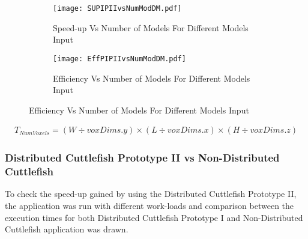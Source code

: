 \begin{figure}
\centering
\captionsetup[subfigure]{labelformat=empty}
\begin{subfigure}
\centering
\texttt{[image: SUPIPIIvsNumModDM.pdf]}
\caption{Speed-up Vs Number of Models For Different Models Input}
\label{fig:SUPIPIIvsNumModDM}
\end{subfigure}
\begin{subfigure}
\centering
\texttt{[image: EffPIPIIvsNumModDM.pdf]}
\caption{Efficiency Vs Number of Models For Different Models Input}
\label{fig:EffPIPIIvsNumModDM}
\end{subfigure}
\end{figure}


\begin{equation}
\label{eq:NumVoxel}
\begin{aligned}
T_{NumVoxels} = (W\div voxDims.y) \times (L\div voxDims.x) \times (H \div voxDims.z)
\end{aligned}
\end{equation}


\subsubsection{Distributed Cuttlefish Prototype II vs Non-Distributed Cuttlefish}
To check the speed-up gained by using the Distributed Cuttlefish Prototype II, the application was run with different work-loads and comparison between the execution times for both Distributed Cuttlefish Prototype I and Non-Distributed Cuttlefish application was drawn.

